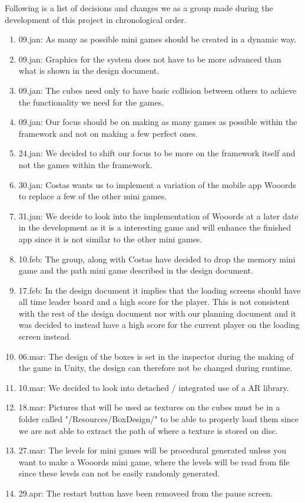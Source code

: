 Following is a list of decisions and changes we as a group made during the development of this project in chronological order.

\begin{enumerate}
	\item 09.jan: As many as possible mini games should be created in a dynamic way.
	\item 09.jan: Graphics for the system does not have to be more advanced than what is shown in the design document.
	\item 09.jan: The cubes need only to have basic collision between others to achieve the functionality we need for the games.
	\item 09.jan: Our focus should be on making as many games as possible within the framework and not on making  a few perfect ones.
	\item 24.jan: We decided to shift our focus to be more on the framework itself and not the games within the framework.
	\item 30.jan: Costas wants us to implement a variation of the mobile app Wooords to replace a few of the other mini games.
	\item 31.jan: We decide to look into the implementation of Wooords at a later date in the development as it is a interesting game and will enhance the finished app since it is not similar to the other mini games.
	\item 10.feb: The group, along with Costas have decided to drop the memory mini game and the path mini game described in the design document.
	\item 17.feb: In the design document it implies that the loading screens should have all time leader board and a high score for the player. This is not consistent with the rest of the design document nor with our planning document and it was decided to instead have a high score for the current player on the loading screen instead.
	\item 06.mar: The design of the boxes is set in the inspector during the making of the game in Unity, the design can therefore not be changed during runtime.
	\item 10.mar: We decided to look into detached / integrated use of a AR library.
	\item 18.mar: Pictures that will be used as textures on the cubes must be in a folder called "/Resources/BoxDesign/" to be able to properly load them since we are not able to extract the path of where a texture is stored on disc.
	\item 27.mar: The levels for mini games will be procedural generated unless you want to make a Wooords mini game, where the levels will be read from file since these levels can not be easily randomly generated.
	\item 29.apr: The restart button have been removeed from the pause screen.
\end{enumerate}

